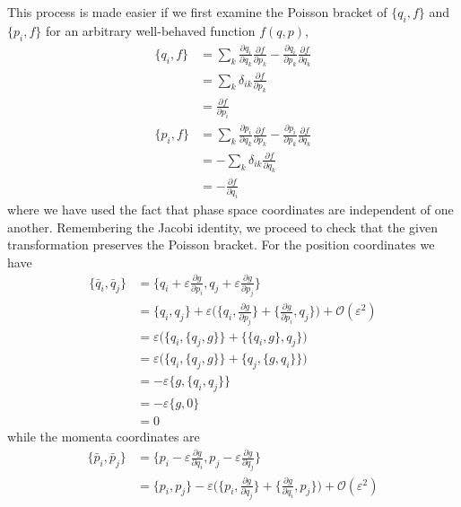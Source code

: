 \documentclass[../principles-of-quantum-mechanics.tex]{subfiles}
\begin{document}
\begin{questions}
		\begin{solution}
			This process is made easier if we first examine the Poisson bracket of $\{q_i, f\}$ and $\{p_i, f\}$ for an arbitrary well-behaved function $f(q, p)$,
			\begin{align*}
				\{q_i, f\} &= \sum_k\frac{\partial q_i}{\partial q_k}\frac{\partial f}{\partial p_k} - \frac{\partial q_i}{\partial p_k}\frac{\partial f}{\partial q_k} \\
				&= \sum_k\delta_{ik}\frac{\partial f}{\partial p_k} \\
				&= \frac{\partial f}{\partial p_i} \\
				\{p_i, f\} &= \sum_k\frac{\partial p_i}{\partial q_k}\frac{\partial f}{\partial p_k} - \frac{\partial p_i}{\partial p_k}\frac{\partial f}{\partial q_k} \\
				&= -\sum_k\delta_{ik}\frac{\partial f}{\partial q_k} \\
				&= -\frac{\partial f}{\partial q_i}
			\end{align*}
			where we have used the fact that phase space coordinates are independent of one another. Remembering the Jacobi identity, we proceed to check that the given transformation preserves the Poisson bracket. For the position coordinates we have
			\begin{align*}
				\{\bar{q}_i, \bar{q}_j\} &= \{q_i + \varepsilon\frac{\partial g}{\partial p_i}, q_j + \varepsilon\frac{\partial g}{\partial p_j}\} \\
				&= \{q_i, q_j\} + \varepsilon\Big(\{q_i,\frac{\partial g}{\partial p_j}\} + \{\frac{\partial g}{\partial p_i}, q_j\}\Big) + \mathcal{O}(\varepsilon^2) \\
				&= \varepsilon\Big(\{q_i, \{q_j, g\}\} + \{\{q_i, g\}, q_j\}\Big) \\
				&= \varepsilon\Big(\{q_i, \{q_j, g\}\} + \{q_j, \{g, q_i\}\}\Big) \\
				&= -\varepsilon\{g, \{q_i, q_j\}\} \\
				&= -\varepsilon\{g, 0\} \\
				&= 0
			\end{align*}
			while the momenta coordinates are
			\begin{align*}
				\{\bar{p}_i, \bar{p}_j\} &= \{p_i - \varepsilon\frac{\partial g}{\partial q_i}, p_j - \varepsilon\frac{\partial g}{\partial q_j}\} \\
				&= \{p_i, p_j\} - \varepsilon\Big(\{p_i, \frac{\partial g}{\partial q_j}\} + \{\frac{\partial g}{\partial q_i}, p_j\}\Big) + \mathcal{O}(\varepsilon^2) \\

\end{align*}
\end{solution}
\end{questions}
\end{document}
